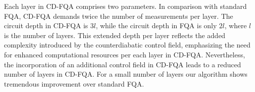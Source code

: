 \documentclass[twocolumn,aps,superscriptaddress,floatfix,longbibliography]{revtex4-2}
\begin{document}
Each layer in CD-FQA comprises two parameters. In comparison
with standard FQA, %
CD-FQA demands twice
the number of measurements per layer. The circuit depth in
CD-FQA is $3l$, while the circuit depth in FQA is only $2l$,
where $l$ is the number of layers. This extended depth per layer
reflects the added complexity introduced by the counterdiabatic
control field, emphasizing the need for enhanced computational
resources per each layer in CD-FQA. Nevertheless, the
incorporation of an additional control field in CD-FQA leads to
a reduced number of layers in CD-FQA. For a small number of
layers our algorithm shows tremendous improvement over standard
FQA.

\end{document}
